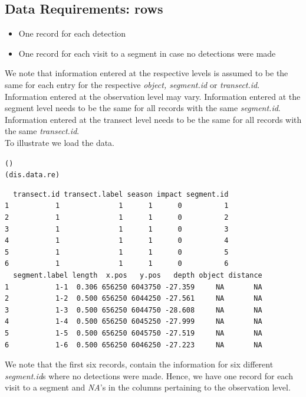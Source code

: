 \subsection{Data Requirements: rows} 
\begin{itemize}
\item{One record for each detection}
\item{One record for each visit to a segment in case no detections were made}
\end{itemize}
\noindent We note that information entered at the respective levels is assumed to be the same for each entry for the respective \textit{object, segment.id} or \textit{transect.id}. Information entered at the observation level may vary. Information entered at the segment level needs to be the same for all records with the same \textit{segment.id}. Information entered at the transect level needs to be the same for all records with the same \textit{transect.id}. \\
\noindent To illustrate we load the data.

\begin{knitrout}\scriptsize
{}\color{fgcolor}\begin{kframe}
\begin{alltt}
()
(dis.data.re)
\end{alltt}
\begin{verbatim}
  transect.id transect.label season impact segment.id
1           1              1      1      0          1
2           1              1      1      0          2
3           1              1      1      0          3
4           1              1      1      0          4
5           1              1      1      0          5
6           1              1      1      0          6
  segment.label length  x.pos   y.pos   depth object distance
1           1-1  0.306 656250 6043750 -27.359     NA       NA
2           1-2  0.500 656250 6044250 -27.561     NA       NA
3           1-3  0.500 656250 6044750 -28.608     NA       NA
4           1-4  0.500 656250 6045250 -27.999     NA       NA
5           1-5  0.500 656250 6045750 -27.519     NA       NA
6           1-6  0.500 656250 6046250 -27.223     NA       NA
\end{verbatim}
\end{kframe}
\end{knitrout}
\noindent We note that the first six records, contain the information for six different \textit{segment.id}s where no detections were made. Hence, we have one record for each visit to a segment and \textit{NA}'s in the columns pertaining to the observation level. 

